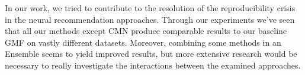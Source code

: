 In our work, we tried to contribute to the resolution of the reproducibility crisis in the neural recommendation approaches. 
Through our experiments we've seen that all our methods except CMN produce comparable results to our baseline GMF on vastly different datasets. 
Moreover, combining some methods in an Ensemble seems to yield improved results, but more extensive research would be necessary to really investigate the interactions between the examined approaches.
